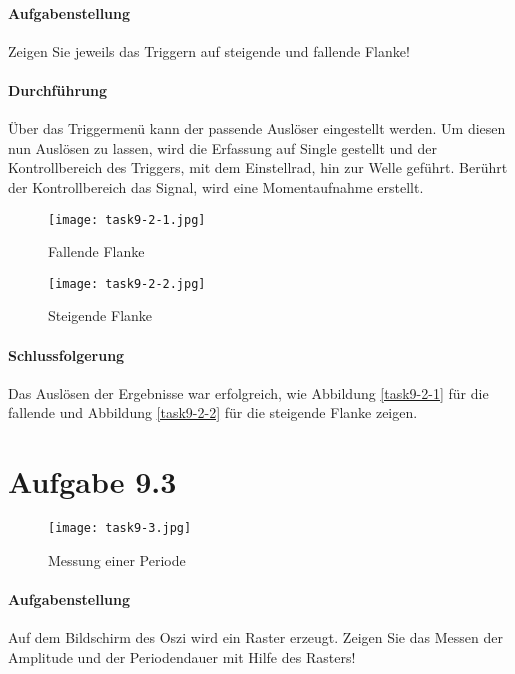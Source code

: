 \paragraph{Aufgabenstellung}
Zeigen Sie jeweils das Triggern auf steigende und fallende Flanke!

\paragraph{Durchführung}
Über das Triggermenü kann der passende Auslöser eingestellt werden. Um diesen nun Auslösen zu lassen, wird die Erfassung auf \glqq{}Single\grqq{} gestellt und der Kontrollbereich des Triggers, mit dem Einstellrad, hin zur Welle geführt. Berührt der Kontrollbereich das Signal, wird eine Momentaufnahme erstellt.

\begin{figure}
	\begin{minipage}[c]{0.48\linewidth}
		\texttt{[image: task9-2-1.jpg]}
		\caption{Fallende Flanke}
		\label{task9-2-1}
	\end{minipage}
	\hfill
	\begin{minipage}[c]{0.485\linewidth}
		\texttt{[image: task9-2-2.jpg]}
		\caption{Steigende Flanke}
		\label{task9-2-2}
	\end{minipage}
	\label{task9-2}
\end{figure}

\paragraph{Schlussfolgerung}
Das Auslösen der Ergebnisse war erfolgreich, wie Abbildung \vref{task9-2-1} für die fallende und Abbildung \vref{task9-2-2} für die steigende Flanke zeigen.

\section{Aufgabe 9.3}
\label{task9.3}

\begin{wrapfigure}[9]{r}{.4\textwidth}
	\texttt{[image: task9-3.jpg]}
	\caption{Messung einer Periode}
	\label{task9-3}
\end{wrapfigure}

\paragraph{Aufgabenstellung}
Auf dem Bildschirm des Oszi wird ein Raster erzeugt. Zeigen Sie das Messen der Amplitude und der Periodendauer mit Hilfe des Rasters!

